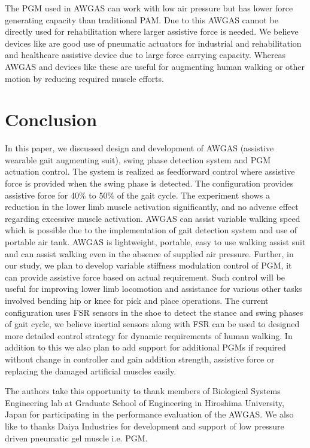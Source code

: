 \documentclass[paper,JRM,paper]{jaciiiarticle}
\begin{document}
The PGM used in AWGAS can work with low air pressure but has lower force generating capacity than traditional PAM. Due to this AWGAS cannot be directly used for rehabilitation where larger assistive force is needed. We believe devices like \cite{5,8} are good use of pneumatic actuators for industrial and rehabilitation and healthcare assistive device due to large force carrying capacity. Whereas AWGAS and devices like these are useful for augmenting human walking or other motion by reducing required muscle efforts.




\section{Conclusion}

In this paper, we discussed design and development of AWGAS (assistive wearable gait augmenting suit), swing phase detection system and PGM actuation control. The system is realized as feedforward control where assistive force is provided when the swing phase is detected. The configuration provides assistive force for 40\% to 50\% of the gait cycle. The experiment shows a reduction in the lower limb muscle activation significantly, and no adverse effect regarding excessive muscle activation. AWGAS can assist variable walking speed which is possible due to the implementation of gait detection system and use of portable air tank. AWGAS is lightweight, portable, easy to use walking assist suit and can assist walking even in the absence of supplied air pressure. Further, in our study, we plan to develop variable stiffness modulation control of PGM, it can provide assistive force based on actual requirement. Such control will be useful for improving lower limb locomotion and assistance for various other tasks involved bending hip or knee for pick and place operations. The current configuration uses FSR sensors in the shoe to detect the stance and swing phases of gait cycle, we believe inertial sensors along with FSR can be used to designed more detailed control strategy for dynamic requirements of human walking. In addition to this we also plan to add support for additional PGMs if required without change in controller and gain addition strength, assistive force or replacing the damaged artificial muscles easily. 

\acknowledgements
The authors take this opportunity to thank members of Biological Systems Engineering lab at Graduate School of Engineering in Hiroshima University, Japan for participating in the performance evaluation of the AWGAS. We also like to thanks Daiya Industries for development and support of low pressure driven pneumatic gel muscle i.e. PGM.
\end{document}
